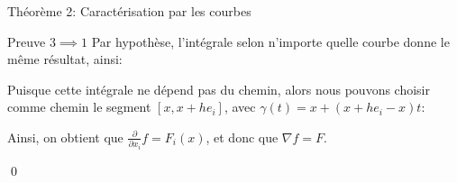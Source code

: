 \documentclass[a4paper]{article}
\begin{document}
\begin{parag}{Théorème 2: Caractérisation par les courbes}
\begin{subparag}{Preuve $3 \implies 1$}
        Par hypothèse, l'intégrale selon n'importe quelle courbe donne le même résultat, ainsi:
        
        Puisque cette intégrale ne dépend pas du chemin, alors nous pouvons choisir comme chemin le segment $\left[x, x + he_i\right]$, avec $\gamma\left(t\right) = x + \left(x + he_i - x\right)t$: 

        Ainsi, on obtient que $\frac{\partial }{\partial x_i} f = F_i\left(x\right)$, et donc que $\nabla f = F$.
        
        \qed
    \end{subparag}
\end{parag}
\end{document}
